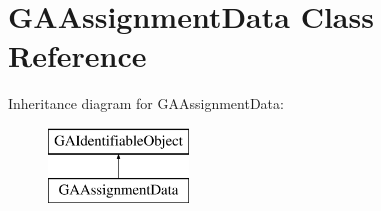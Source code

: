 \hypertarget{class_g_a_assignment_data}{}\section{G\+A\+Assignment\+Data Class Reference}
\label{class_g_a_assignment_data}
Inheritance diagram for G\+A\+Assignment\+Data\+:\begin{figure}[H]
\begin{center}
\leavevmode
\includegraphics[height=2.000000cm]{class_g_a_assignment_data}
\end{center}
\end{figure}
